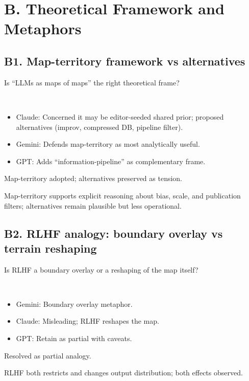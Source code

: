 \documentclass[11pt,letterpaper]{article}
\begin{document}
\section{B. Theoretical Framework and Metaphors}

\subsection{B1. Map-territory framework vs alternatives}

\begin{reflist}
\item[Dispute:] Is ``LLMs as maps of maps'' the right theoretical frame?
\item[Positions:]~
  \begin{itemize}[nosep]
    \item Claude: Concerned it may be editor-seeded shared prior; proposed alternatives (improv, compressed DB, pipeline filter).
    \item Gemini: Defends map-territory as most analytically useful.
    \item GPT: Adds ``information-pipeline'' as complementary frame.
  \end{itemize}
\item[Status:] Map-territory adopted; alternatives preserved as tension.
\item[Evidence:] Map-territory supports explicit reasoning about bias, scale, and publication filters; alternatives remain plausible but less operational.
\end{reflist}

\subsection{B2. RLHF analogy: boundary overlay vs terrain reshaping}

\begin{reflist}
\item[Dispute:] Is RLHF a boundary overlay or a reshaping of the map itself?
\item[Positions:]~
  \begin{itemize}[nosep]
    \item Gemini: Boundary overlay metaphor.
    \item Claude: Misleading; RLHF reshapes the map.
    \item GPT: Retain as partial with caveats.
  \end{itemize}
\item[Status:] Resolved as partial analogy.
\item[Evidence:] RLHF both restricts and changes output distribution; both effects observed.
\end{reflist}
\end{document}

